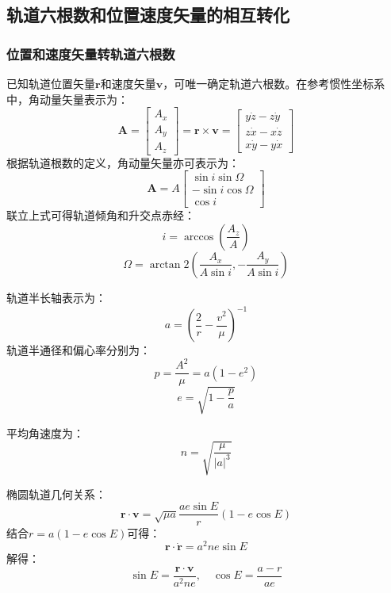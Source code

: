 \documentclass[12pt,a4paper]{article}
\begin{document}
\subsection{轨道六根数和位置速度矢量的相互转化}
\subsubsection{位置和速度矢量转轨道六根数}

已知轨道位置矢量$\mathbf{r}$和速度矢量$\mathbf{v}$，可唯一确定轨道六根数。在参考惯性坐标系中，角动量矢量表示为：
$$
\mathbf{A} = \begin{bmatrix} A_x \\ A_y \\ A_z \end{bmatrix} = \mathbf{r} \times \mathbf{v} = \begin{bmatrix} y\dot{z} - z\dot{y} \\ z\dot{x} - x\dot{z} \\ x\dot{y} - y\dot{x} \end{bmatrix}
$$
根据轨道根数的定义，角动量矢量亦可表示为：
$$
\mathbf{A} = A \begin{bmatrix} \sin i \sin\Omega \\ -\sin i \cos\Omega \\ \cos i \end{bmatrix}
$$
联立上式可得轨道倾角和升交点赤经：
\begin{equation}
i = \arccos\left( \frac{A_z}{A} \right)
\end{equation}
\begin{equation}
\Omega = \arctan 2\left( \frac{A_x}{A \sin i}, -\frac{A_y}{A \sin i} \right)
\end{equation}

轨道半长轴表示为：
$$
a = \left( \frac{2}{r} - \frac{v^2}{\mu} \right)^{-1}
$$
轨道半通径和偏心率分别为：
\begin{equation}
p = \frac{A^2}{\mu} = a(1 - e^2)
\end{equation}
\begin{equation}
e = \sqrt{1 - \frac{p}{a}}
\end{equation}

平均角速度为：
$$
n = \sqrt{\frac{\mu}{|a|^3}}
$$

椭圆轨道几何关系：
$$
\mathbf{r} \cdot \mathbf{v} = \sqrt{\mu a} \frac{a e \sin E}{r}(1 - e \cos E)
$$
结合$r = a(1 - e \cos E)$可得：
$$
\mathbf{r} \cdot \dot{\mathbf{r}} = a^2 n e \sin E
$$
解得：
\begin{equation}
\sin E = \frac{\mathbf{r} \cdot \mathbf{v}}{a^2 n e}, \quad \cos E = \frac{a - r}{a e}
\end{equation}
\end{document}
